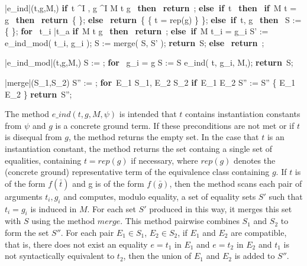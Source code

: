 \documentclass{llncs}
\def\IF{\qtab\keyword{if}\ }
\def\THEN{\ \keyword{then}\ }
\def\ELSE{\untab\qtab\keyword{else}\ }
\def\ELSEIF{\untab\qtab\keyword{else if}\ }
\def\FI{\untab}
\def\RETURN{\keyword{return}\ }
\def\ENDPROC{\untab}
\def\DOFOR{\qtab\keyword{for}\ }
\def\ENDFOR{\untab}
\def\keyword#1{\mbox{\normalshape\bf #1}}
\begin{document}
\begin{minipage}[t]{.4\linewidth}
\begin{program}
\PROC |e\_ind|(t,g,M,\psi) \BODY
  \IF t \not\mapsto^I \psi, g \not\mapsto^I \emptyset {} M \models t \neq g \THEN
    \RETURN \emptyset;
  \ELSEIF t  \THEN
    \IF M \models t = g \THEN
      \RETURN \{ \emptyset \};
    \ELSE
      \RETURN \{ \{ t = rep(g) \} \};
    \FI
  \ELSEIF t, g  \THEN
    S := \{ \emptyset \};
    \DOFOR {} t_i  \bar{t_a} 
      \IF M \models t \neq g \THEN
        \RETURN \emptyset;
      \ELSEIF M \not\models t_i = g_i
        S' := e\_ind\_mod( t_i, g_i );
        S := merge( S, S' );
      \FI
    \ENDFOR
    \RETURN S;
  \ELSE
    \RETURN \emptyset;
  \FI
\ENDPROC
\end{program}
\end{minipage}
\begin{minipage}[t]{.4\linewidth}
\begin{program}
\PROC |e\_ind\_mod|(t,g,M,\psi) \BODY
  S := \emptyset;
  \DOFOR {} g_i = g
    S := S \cup e\_ind( t, g_i, M,\psi );
  \ENDFOR
  \RETURN S;
\ENDPROC
\end{program}
\begin{program}
\PROC |merge|(S_1,S_2) \BODY
  S'' := \emptyset;
  \DOFOR E_1 \in S_1, E_2 \in S_2
    \IF E_1  E_2 
      S'' := S'' \cup \{ E_1 \cup E_2 \}
    \FI
  \ENDFOR
  \RETURN S'';
\ENDPROC
\end{program}
\end{minipage}

The method $e\_ind(t,g,M,\psi)$ is intended that $t$ contains instantiation constants from $\psi$ and $g$ is a concrete ground term.
If these preconditions are not met or if $t$ is disequal from $g$, the method returns the empty set.
In the case that $t$ is an instantiation constant, the method returns the set containg a single set of equalities, containing $t = rep( g )$ if necessary, where $rep( g )$ denotes the (concrete ground) representative term of the equivalence class containing $g$.
If $t$ is of the form $f(\bar{t})$ and g is of the form $f(\bar{g})$, then the method scans each pair of arguments $t_i, g_i$ and computes, modulo equality, a set of equality sets $S'$ such that $t_i = g_i$ is induced in $M$.
For each set $S'$ produced in this way, it merges this set with $S$ using the method $merge$.
This method pairwise combines $S_1$ and $S_2$ to form the set $S''$.
For each pair $E_1 \in S_1$, $E_2 \in S_2$, if $E_1$ and $E_2$ are compatible, that is, there does not exist an equality $e = t_1$ in $E_1$ and $e = t_2$ in $E_2$ and $t_1$ is not syntactically equivalent to $t_2$, then the union of $E_1$ and $E_2$ is added to $S''$.
\end{document}
